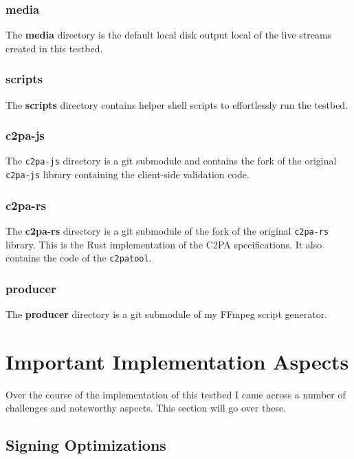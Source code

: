 \subsubsection{media}

The \textbf{media} directory is the default local disk output local of the live streams created in this testbed.

\subsubsection{scripts}

The \textbf{scripts} directory contains helper shell scripts to effortlessly run the testbed.

\subsubsection{c2pa-js}

The \texttt{c2pa-js} directory is a git submodule and contains the fork of the original \texttt{c2pa-js} library containing the client-side validation code.

\subsubsection{c2pa-rs} 

The \textbf{c2pa-rs} directory is a git submodule of the fork of the original \texttt{c2pa-rs} library. This is the Rust implementation of the C2PA specifications. It also contains the code of the \texttt{c2patool}.

\subsubsection{producer}

The \textbf{producer} directory is a git submodule of my FFmpeg script generator.

\section{Important Implementation Aspects\label{sec:implaspects}}

Over the course of the implementation of this testbed I came across a number of challenges and noteworthy aspects. This section will go over these.

\subsection{Signing Optimizations\label{sec:optimization}}

